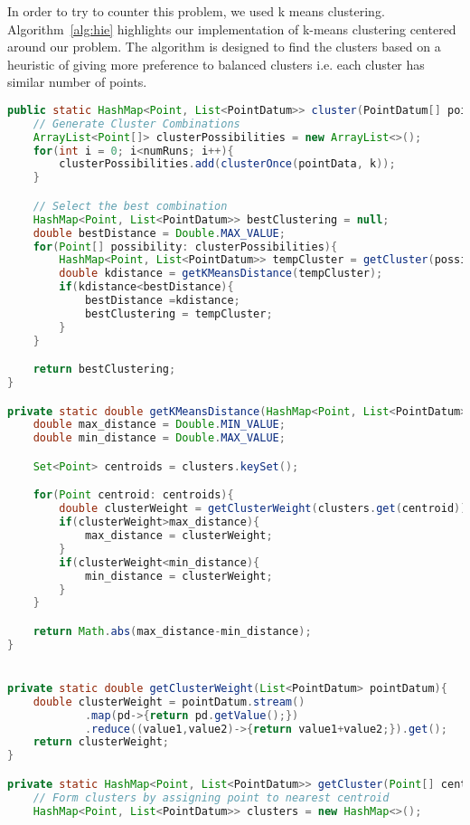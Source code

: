 In order to try to counter this problem, we used k means clustering. Algorithm~\ref{alg:hie} highlights our implementation of k-means clustering centered around our problem. The algorithm is designed to find the clusters based on a heuristic of giving more preference to balanced clusters i.e. each cluster has similar number of points.


\begin{lstlisting}[language=JAVA, caption=Algorithm for K means, label=alg:kmeans]
public static HashMap<Point, List<PointDatum>> cluster(PointDatum[] pointData, int k, int numRuns){
    // Generate Cluster Combinations
    ArrayList<Point[]> clusterPossibilities = new ArrayList<>();
    for(int i = 0; i<numRuns; i++){
        clusterPossibilities.add(clusterOnce(pointData, k));
    }

    // Select the best combination
    HashMap<Point, List<PointDatum>> bestClustering = null;
    double bestDistance = Double.MAX_VALUE;
    for(Point[] possibility: clusterPossibilities){
        HashMap<Point, List<PointDatum>> tempCluster = getCluster(possibility, pointData);
        double kdistance = getKMeansDistance(tempCluster);
        if(kdistance<bestDistance){
            bestDistance =kdistance;
            bestClustering = tempCluster;
        }
    }

    return bestClustering;
}

private static double getKMeansDistance(HashMap<Point, List<PointDatum>> clusters){
    double max_distance = Double.MIN_VALUE;
    double min_distance = Double.MAX_VALUE;

    Set<Point> centroids = clusters.keySet();

    for(Point centroid: centroids){
        double clusterWeight = getClusterWeight(clusters.get(centroid));
        if(clusterWeight>max_distance){
            max_distance = clusterWeight;
        }
        if(clusterWeight<min_distance){
            min_distance = clusterWeight;
        }
    }

    return Math.abs(max_distance-min_distance);
}


private static double getClusterWeight(List<PointDatum> pointDatum){
    double clusterWeight = pointDatum.stream()
            .map(pd->{return pd.getValue();})
            .reduce((value1,value2)->{return value1+value2;}).get();
    return clusterWeight;
}

private static HashMap<Point, List<PointDatum>> getCluster(Point[] centroids, PointDatum[] pointData){
    // Form clusters by assigning point to nearest centroid
    HashMap<Point, List<PointDatum>> clusters = new HashMap<>();


\end{lstlisting}
